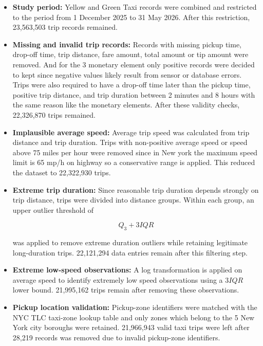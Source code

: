 \documentclass[11pt]{article}
\begin{document}
\begin{itemize}

    \item \textbf{Study period:}
    Yellow and Green Taxi records were combined and restricted to the period from 
    1 December 2025 to 31 May 2026. After this restriction, 23,563,503 trip records remained.

    \item \textbf{Missing and invalid trip records:}
    Records with missing pickup time, drop-off time, trip distance, fare amount, total amount 
    or tip amount were removed. And for the 3 monetary element only positive records were decided to kept since negative values likely result from sensor or database errors. Trips were also required to have a drop-off time later than the pickup time, positive trip distance, and trip duration between 2 minutes and 8 hours with the same reason like the monetary elements. After these validity checks, 22,326,870 trips remained.

    \item \textbf{Implausible average speed:}
    Average trip speed was calculated from trip distance and trip duration. Trips with non-positive average speed or speed above 75 miles per hour were removed since in New york the maximum speed limit is 65 mp/h \cite{nyc311_speedlimits} on highway so a conservative range is applied. This reduced the dataset to 22,322,930 trips.

    \item \textbf{Extreme trip duration:}
    Since reasonable trip duration depends strongly on trip distance, trips were divided into 
    distance groups. Within each group, an upper outlier threshold of
    
    \[
    Q_3 + 3IQR
    \]
    
    was applied to remove extreme duration outliers while retaining legitimate long-duration trips. 22,121,294 data entries remain after this filtering step.
    
    \item \textbf{Extreme low-speed observations:}
    A log transformation is applied on average speed to identify extremely low speed observations using a $3IQR$ lower bound. 21,995,162 trips remain after removing these observations.

    \item \textbf{Pickup location validation:}
    Pickup-zone identifiers were matched with the NYC TLC taxi-zone lookup table and only zones which belong to the 5 New York city boroughs were retained. 21,966,943 valid taxi trips were left after 28,219 records was removed due to invalid pickup-zone identifiers.

\end{itemize}
\end{document}
